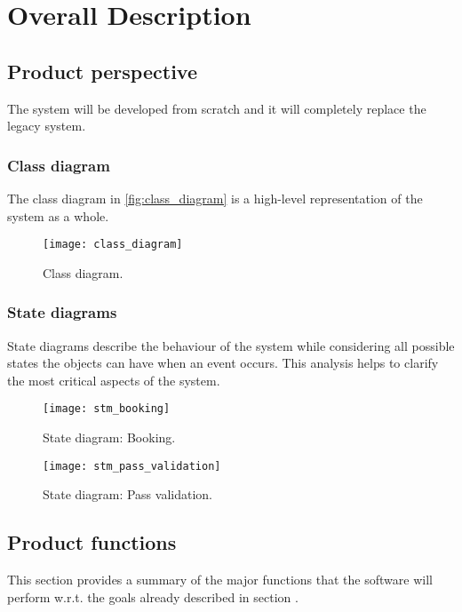 \chapter{Overall Description}

\section{Product perspective}

The system will be developed from scratch and it will completely replace the legacy system.\newline

\subsection{Class diagram}
The class diagram in \autoref{fig:class_diagram} is a high-level representation of the system as a whole.

\begin{figure}[H]\label{fig:class_diagram}
	\centering
	\texttt{[image: class\_diagram]}
	\caption{Class diagram.}
\end{figure}


\subsection{State diagrams}
State diagrams describe the behaviour of the system while considering all possible states the objects can have when an event occurs. This analysis helps to clarify the most critical aspects of the system.

\begin{figure}[H]
	\centering
	\texttt{[image: stm\_booking]}
	\caption{State diagram: Booking.}
\end{figure}

\begin{figure}[H]
	\centering
	\texttt{[image: stm\_pass\_validation]}
	\caption{State diagram: Pass validation.}
\end{figure}


\section{Product functions}\label{desc:prodFunc}
This section provides a summary of the major functions that the software will perform w.r.t. the goals already described in section .

